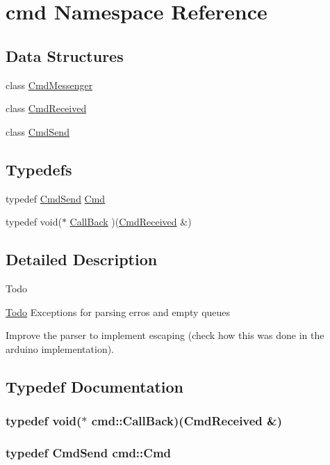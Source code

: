 \hypertarget{namespacecmd}{\section{cmd Namespace Reference}
\label{namespacecmd}
}
\subsection*{Data Structures}
\begin{DoxyCompactItemize}
\item 
class \hyperlink{classcmd_1_1_cmd_messenger}{Cmd\+Messenger}
\item 
class \hyperlink{classcmd_1_1_cmd_received}{Cmd\+Received}
\item 
class \hyperlink{classcmd_1_1_cmd_send}{Cmd\+Send}
\end{DoxyCompactItemize}
\subsection*{Typedefs}
\begin{DoxyCompactItemize}
\item 
typedef \hyperlink{classcmd_1_1_cmd_send}{Cmd\+Send} \hyperlink{namespacecmd_af9b58ca395c80edd1335e21d1b9f4c99}{Cmd}
\item 
typedef void($\ast$ \hyperlink{namespacecmd_a20b40ecd3ba46130eef6c125f70c4121}{Call\+Back} )(\hyperlink{classcmd_1_1_cmd_received}{Cmd\+Received} \&)
\end{DoxyCompactItemize}


\subsection{Detailed Description}
\begin{DoxyRefDesc}{Todo}
\item[\hyperlink{todo__todo000004}{Todo}]Exceptions for parsing erros and empty queues 

Improve the parser to implement escaping (check how this was done in the arduino implementation). \end{DoxyRefDesc}


\subsection{Typedef Documentation}
\hypertarget{namespacecmd_a20b40ecd3ba46130eef6c125f70c4121}{
\subsubsection[{Call\+Back}]{\setlength{\rightskip}{0pt plus 5cm}typedef void($\ast$ cmd\+::\+Call\+Back)({\bf Cmd\+Received} \&)}}\label{namespacecmd_a20b40ecd3ba46130eef6c125f70c4121}
\hypertarget{namespacecmd_af9b58ca395c80edd1335e21d1b9f4c99}{
\subsubsection[{Cmd}]{\setlength{\rightskip}{0pt plus 5cm}typedef {\bf Cmd\+Send} {\bf cmd\+::\+Cmd}}}\label{namespacecmd_af9b58ca395c80edd1335e21d1b9f4c99}
